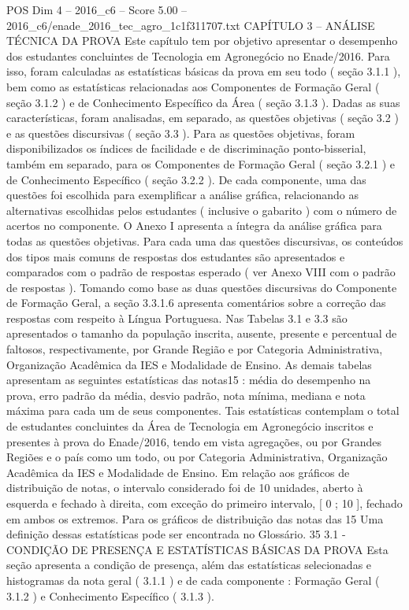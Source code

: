 \begin{textsample}{POS Dim 4 – 2016\_c6 – Score 5.00 – 2016\_c6/enade\_2016\_tec\_agro\_1c1f311707.txt}  \label{ex:f4_pos_054}
CAPÍTULO 3 – ANÁLISE TÉCNICA DA PROVA Este capítulo tem por objetivo apresentar o desempenho dos estudantes concluintes de Tecnologia em Agronegócio no Enade/2016.
Para isso, foram calculadas as estatísticas básicas da prova em seu todo ( seção 3.1.1 ), bem como as estatísticas relacionadas aos Componentes de Formação Geral ( seção 3.1.2 ) e de Conhecimento Específico da Área ( seção 3.1.3 ).
Dadas as suas características, foram analisadas, em separado, as questões objetivas ( seção 3.2 ) e as questões discursivas ( seção 3.3 ).
Para as questões objetivas, foram disponibilizados os índices de facilidade e de discriminação ponto-bisserial, também em separado, para os Componentes de Formação Geral ( seção 3.2.1 ) e de Conhecimento Específico ( seção 3.2.2 ).
De cada componente, uma das questões foi escolhida para exemplificar a análise gráfica, relacionando as alternativas escolhidas pelos estudantes ( inclusive o gabarito ) com o número de acertos no componente.
O Anexo I apresenta a íntegra da análise gráfica para todas as questões objetivas.
Para cada uma das questões discursivas, os conteúdos dos tipos mais comuns de respostas dos estudantes são apresentados e comparados com o padrão de respostas esperado ( ver Anexo VIII com o padrão de respostas ).
Tomando como base as duas questões discursivas do Componente de Formação Geral, a seção 3.3.1.6 apresenta comentários sobre a correção das respostas com respeito à Língua Portuguesa.
Nas Tabelas 3.1 e 3.3 são apresentados o tamanho da população inscrita, ausente, presente e percentual de faltosos, respectivamente, por Grande Região e por Categoria Administrativa, Organização Acadêmica da IES e Modalidade de Ensino.
As demais tabelas apresentam as seguintes estatísticas das notas15 : média do desempenho na prova, erro padrão da média, desvio padrão, nota mínima, mediana e nota máxima para cada um de seus componentes.
Tais estatísticas contemplam o total de estudantes concluintes da Área de Tecnologia em Agronegócio inscritos e presentes à prova do Enade/2016, tendo em vista agregações, ou por Grandes Regiões e o país como um todo, ou por Categoria Administrativa, Organização Acadêmica da IES e Modalidade de Ensino.
Em relação aos gráficos de distribuição de notas, o intervalo considerado foi de 10 unidades, aberto à esquerda e fechado à direita, com exceção do primeiro intervalo, [ 0 ; 10 ], fechado em ambos os extremos.
Para os gráficos de distribuição das notas das 15 Uma definição dessas estatísticas pode ser encontrada no Glossário. 35 3.1 - CONDIÇÃO DE PRESENÇA E ESTATÍSTICAS BÁSICAS DA PROVA Esta seção apresenta a condição de presença, além das estatísticas selecionadas e histogramas da nota geral ( 3.1.1 ) e de cada componente : Formação Geral ( 3.1.2 ) e Conhecimento Específico ( 3.1.3 ).

\end{textsample}
